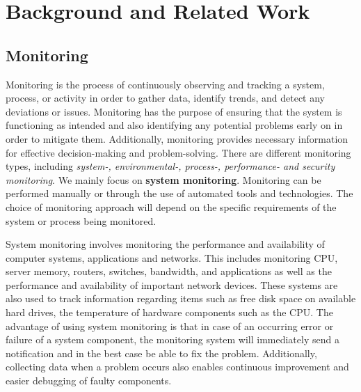\chapter{Background and Related Work}
\label{ch:background}

    \section{Monitoring}
    \label{sec:monitoring-background}

        Monitoring is the process of continuously observing and tracking a system, process, or activity in order to gather data, identify trends, and detect any deviations or issues.
        Monitoring has the purpose of ensuring that the system is functioning as intended and also identifying any potential problems early on in order to mitigate them. Additionally, monitoring provides necessary information for effective decision-making and problem-solving.
        There are different monitoring types, including \emph{system-, environmental-, process-, performance- and security monitoring}.
        We mainly focus on \textbf{system monitoring}.
        Monitoring can be performed manually or through the use of automated tools and technologies.
        The choice of monitoring approach will depend on the specific requirements of the system or process being monitored.

        System monitoring involves monitoring the performance and availability of computer systems, applications and networks.
        This includes monitoring CPU, server memory, routers, switches, bandwidth, and applications as well as the performance and availability of important network devices. 
        These systems are also used to track information regarding items such as free disk space on available hard drives, the temperature of hardware components such as the CPU.
        The advantage of using system monitoring is that in case of an occurring error or failure of a system component, the monitoring system will immediately send a notification and in the best case be able to fix the problem.
        Additionally, collecting data when a problem occurs also enables continuous improvement and easier debugging of faulty components.




